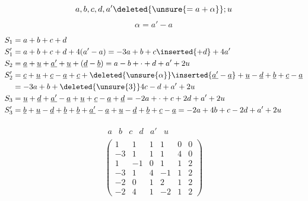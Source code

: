 \[
a,b,c,d,a'\deleted{\unsure{=a+\alpha}};u
\]
\[
\alpha=a'-a
\]

\[
\begin{aligned}
S_1&=a+b+c+d\\
S'_1&=a+b+c+d+4(a'-a)=-3a+b+c\inserted{+d}+4a'\\
S_2&=\underline a+\underline u+\underline{a'}+\underline u+(\underline d-\underline b)=a-b+\cdot+d+a'+2u\\
S'_2&=\underline c+\underline u+\underline c-\underline a+\underline c+\deleted{\unsure{\alpha}}\inserted{\underline{a'}-\underline a}+\underline u-\underline d+\underline b+\underline c-\underline a\\
&=-3a+b+\deleted{\unsure{3}}4c-d+a'+2u\\
S_3&=\underline u+\underline d+\underline{a'}-\underline a+\underline u+\underline c-\underline a+\underline d=-2a+\cdot+c+2d+a'+2u\\
S'_3&=\underline b+\underline u-\underline d+\underline b+\underline b+\underline{a'}-\underline a+\underline u-\underline d+\underline b+\underline c-\underline a=-2a+4b+c-2d+a'+2u
\end{aligned}
\]

\[
\begin{array}{c}
\begin{array}{rrrrrr}a&b&c&d&a'&u\end{array}\\
\begin{pmatrix}1&1&1&1&0&0\\-3&1&1&1&4&0\\1&-1&0&1&1&2\\-3&1&4&-1&1&2\\-2&0&1&2&1&2\\-2&4&1&-2&1&2\end{pmatrix}
\end{array}
\]

